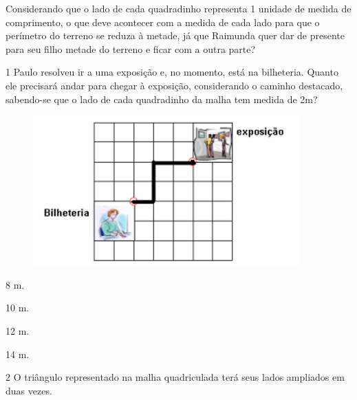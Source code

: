 Considerando que o lado de cada quadradinho representa 1 unidade de
medida de comprimento, o que deve acontecer com a medida de cada lado
para que o perímetro do terreno se reduza à metade, já que Raimunda quer
dar de presente para seu filho metade do terreno e ficar com a outra
parte?


\pagebreak
{}

\num{1} Paulo resolveu ir a uma exposição e, no momento, está na bilheteria. Quanto ele precisará andar para chegar à exposição,
considerando o caminho destacado, sabendo-se que o lado de cada quadradinho da malha tem medida de 2m?

\begin{figure}[htpb!]
\centering
\includegraphics[width=\textwidth]{./imgs/mat8.png}
\end{figure}

\begin{minipage}{.5\textwidth}
\begin{escolha}
\item
  8 m.
\item
  10 m.
\item
  12 m.
\item
  14 m.
\end{escolha}
\end{minipage}

\pagebreak
\num{2} O triângulo representado na malha quadriculada terá seus lados ampliados em duas vezes.

